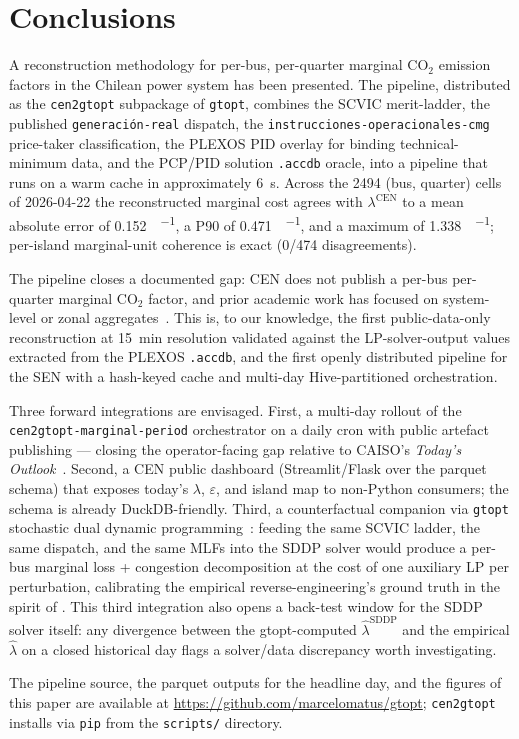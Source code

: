 \section{Conclusions}
\label{sec:conclusions}

A reconstruction methodology for per-bus, per-quarter marginal
CO$_2$ emission factors in the Chilean power system has been
presented.  The pipeline, distributed as the \texttt{cen2gtopt}
subpackage of \texttt{gtopt}, combines the SCVIC merit-ladder, the
published \texttt{generaci\'on-real} dispatch, the
\texttt{instrucciones-operacionales-cmg} price-taker classification,
the PLEXOS PID overlay for binding technical-minimum data, and the
PCP/PID solution \texttt{.accdb} oracle, into a pipeline that runs
on a warm cache in approximately \SI{6}{\second}.  Across the
\num{2494} (bus, quarter) cells of 2026-04-22 the reconstructed
marginal cost agrees with $\lambda^{\mathrm{CEN}}$ to a mean
absolute error of \SI{0.152}{\USD\per\MWh}, a P90 of
\SI{0.471}{\USD\per\MWh}, and a maximum of
\SI{1.338}{\USD\per\MWh}; per-island marginal-unit coherence is
exact (\num{0}/\num{474} disagreements).

The pipeline closes a documented gap: CEN does not publish a per-bus
per-quarter marginal CO$_2$ factor, and prior academic work has
focused on system-level or zonal aggregates~\cite{Bonvallet2016,
Moreno2014}.  This is, to our knowledge, the first public-data-only
reconstruction at \SI{15}{\minute} resolution validated against the
LP-solver-output values extracted from the PLEXOS \texttt{.accdb},
and the first openly distributed pipeline for the SEN with a
hash-keyed cache and multi-day Hive-partitioned orchestration.

Three forward integrations are envisaged.  First, a multi-day rollout
of the \texttt{cen2gtopt-marginal-period} orchestrator on a daily
cron with public artefact publishing — closing the operator-facing
gap relative to CAISO's \textit{Today's
Outlook}~\cite{CAISOOutlook}.  Second, a CEN public dashboard
(Streamlit/Flask over the parquet schema) that exposes today's
$\lambda$, $\varepsilon$, and island map to non-Python consumers;
the schema is already DuckDB-friendly.  Third, a counterfactual
companion via \texttt{gtopt} stochastic dual dynamic
programming~\cite{gtopt2026}: feeding the same SCVIC ladder, the
same dispatch, and the same MLFs into the SDDP solver would produce
a per-bus marginal loss + congestion decomposition at the cost of
one auxiliary LP per perturbation, calibrating the empirical
reverse-engineering's ground truth in the spirit of
\cite{ValenzuelaASL2022}.  This third integration also opens a
back-test window for the SDDP solver itself: any divergence between
the gtopt-computed $\hat\lambda^{\mathrm{SDDP}}$ and the empirical
$\hat\lambda$ on a closed historical day flags a solver/data
discrepancy worth investigating.

The pipeline source, the parquet outputs for the headline day, and
the figures of this paper are available at
\url{https://github.com/marcelomatus/gtopt}; \texttt{cen2gtopt}
installs via \texttt{pip} from the \texttt{scripts/} directory.
